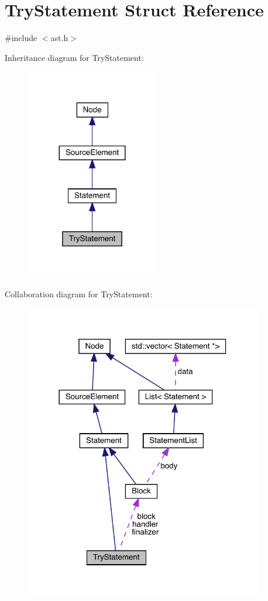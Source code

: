 \hypertarget{struct_try_statement}{}\section{Try\+Statement Struct Reference}
\label{struct_try_statement}


{\ttfamily \#include $<$ast.\+h$>$}



Inheritance diagram for Try\+Statement\+:\nopagebreak
\begin{figure}[H]
\begin{center}
\leavevmode
\includegraphics[width=164pt]{struct_try_statement__inherit__graph}
\end{center}
\end{figure}


Collaboration diagram for Try\+Statement\+:\nopagebreak
\begin{figure}[H]
\begin{center}
\leavevmode
\includegraphics[width=294pt]{struct_try_statement__coll__graph}
\end{center}
\end{figure}
